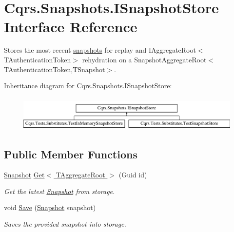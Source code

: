 \hypertarget{interfaceCqrs_1_1Snapshots_1_1ISnapshotStore}{}\section{Cqrs.\+Snapshots.\+I\+Snapshot\+Store Interface Reference}
\label{interfaceCqrs_1_1Snapshots_1_1ISnapshotStore}


Stores the most recent \hyperlink{classCqrs_1_1Snapshots_1_1Snapshot}{snapshots} for replay and I\+Aggregate\+Root$<$\+T\+Authentication\+Token$>$ rehydration on a Snapshot\+Aggregate\+Root$<$\+T\+Authentication\+Token,\+T\+Snapshot$>$.  


Inheritance diagram for Cqrs.\+Snapshots.\+I\+Snapshot\+Store\+:\begin{figure}[H]
\begin{center}
\leavevmode
\includegraphics[height=1.818182cm]{interfaceCqrs_1_1Snapshots_1_1ISnapshotStore}
\end{center}
\end{figure}
\subsection*{Public Member Functions}
\begin{DoxyCompactItemize}
\item 
\hyperlink{classCqrs_1_1Snapshots_1_1Snapshot}{Snapshot} \hyperlink{interfaceCqrs_1_1Snapshots_1_1ISnapshotStore_ab7bd163fc9cd5c3bd5911679030be403_ab7bd163fc9cd5c3bd5911679030be403}{Get$<$ T\+Aggregate\+Root $>$} (Guid id)
\begin{DoxyCompactList}\small\item\em Get the latest \hyperlink{classCqrs_1_1Snapshots_1_1Snapshot}{Snapshot} from storage. \end{DoxyCompactList}\item 
void \hyperlink{interfaceCqrs_1_1Snapshots_1_1ISnapshotStore_a6e99c620115ce8a0648a83bf2ce05527_a6e99c620115ce8a0648a83bf2ce05527}{Save} (\hyperlink{classCqrs_1_1Snapshots_1_1Snapshot}{Snapshot} snapshot)
\begin{DoxyCompactList}\small\item\em Saves the provided {\itshape snapshot}  into storage. \end{DoxyCompactList}\end{DoxyCompactItemize}


